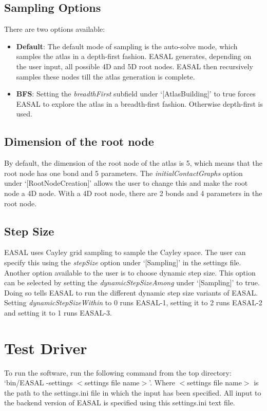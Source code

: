 \documentclass[10pt]{article}
\begin{document}
\subsection{Sampling Options} 
There are two options available:
\begin{itemize}
\item \textbf{Default}: The default mode of sampling is the auto-solve mode,
which samples the atlas in a depth-first fashion. EASAL generates,
depending on the user input, all possible 4D and 5D root nodes. 
EASAL then recursively samples these nodes till the atlas generation
is complete.

\item \textbf{BFS}: Setting the \emph{breadthFirst} subfield under
`[AtlasBuilding]' to true forces EASAL to explore the atlas in a breadth-first
fashion. Otherwise depth-first is used.

\end{itemize}

\subsection{Dimension of the root node}
By default, the dimension of the root node of the atlas is 5, which means that
the root node has one bond and 5 parameters. The \emph{initialContactGraphs}
option under `[RootNodeCreation]' allows the user to change this and make the
root node a 4D node. With a 4D root node, there are 2 bonds and 4 parameters in
the root node.

\subsection{Step Size}
EASAL uses Cayley grid sampling to sample the Cayley space. The user can
specify this using the \emph{stepSize} option under `[Sampling]' in the
settings file. Another option available to the user is to choose dynamic step
size. This option can be selected by setting the \emph{dynamicStepSizeAmong}
under `[Sampling]' to true. Doing so tells EASAL to run the different dynamic
step size variants of EASAL. Setting \emph{dynamicStepSizeWithin} to 0 runs
EASAL-1, setting it to 2 runs EASAL-2 and setting it to 1 runs EASAL-3.

\section{Test Driver}
\label{sec:test}

To run the software, run the following command from the top directory:
`bin/EASAL -settings $<$settings file name$>$'.  Where $<$settings file name$>$
is the path to the settings.ini file in which the input has been specified. All
input to the backend version of EASAL is specified using this settings.ini text
file.
\end{document}
